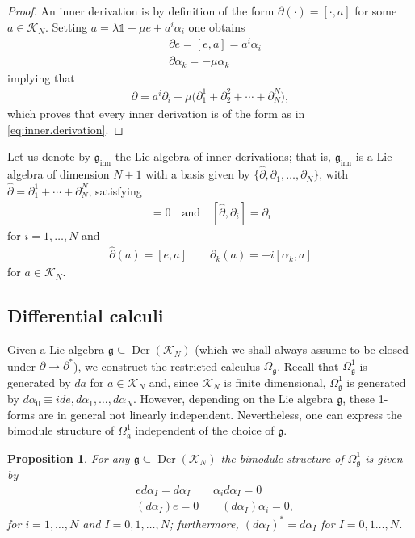 \documentclass{amsart}
\newcommand{\paraa}[1]{\big(#1\big)}
\newtheorem{proposition}[theorem]{Proposition}
\theoremstyle{definition}
\theoremstyle{remark}
\numberwithin{equation}{section}
\newcommand{\K}{\mathcal{K}}
\renewcommand{\mid}{\mathds{1}}
\newcommand{\KN}{\K_N}
\renewcommand{\d}{\partial}
\newcommand{\Der}{\operatorname{Der}}
\newcommand{\qand}{\quad\text{and}\quad}
\newcommand{\g}{\mathfrak{g}}
\newcommand{\ginn}{\g_{\textrm{inn}}}
\renewcommand{\dh}{\hat{\partial}}
\newcommand{\Omegag}[1]{\Omega^{#1}_{\g}}
\newcommand{\Omegaoneg}{\Omega^1_{\g}}
\begin{document}
\begin{proof}
  An inner derivation is by definition of the form
  $\d(\cdot)=[\cdot,a]$ for some $a\in\KN$. Setting
  $a=\lambda\mid+\mu e+a^i\alpha_i$ one obtains
  \begin{align*}
    &\d e = [e,a] = a^i\alpha_i\\
    &\d\alpha_k = -\mu\alpha_k
  \end{align*}
  implying that
  \begin{align*}
    \d = a^i\d_i - \mu\paraa{\d^1_1+\d^2_2+\cdots+\d_N^N},
  \end{align*}
  which proves that every inner derivation is of the form as in
  \eqref{eq:inner.derivation}.
\end{proof}

\noindent
Let us denote by $\ginn$ the Lie algebra of inner derivations; that
is, $\ginn$ is a Lie algebra of dimension $N+1$ with a basis given by
$\{\dh,\d_1,\ldots,\d_N\}$, with $\dh=\d_1^1+\cdots+\d_N^N$, satisfying
\begin{align*}
  [\d_i,\d_j] = 0\qand
  [\dh,\d_i] = \d_i
\end{align*}
for $i=1,\ldots,N$ and
\begin{align*}
  \dh(a) = [e,a]\qquad \d_k(a) = -i[\alpha_k,a]
\end{align*}
for $a\in\KN$.

\subsection{Differential calculi}

Given a Lie algebra $\g\subseteq\Der(\KN)$ (which we shall always
assume to be closed under $\d\to\d^\ast$), we construct the restricted
calculus $\Omegag{}$. Recall that $\Omegaoneg$ is generated by $da$
for $a\in\KN$ and, since $\KN$ is finite dimensional, $\Omegaoneg$ is
generated by $d\alpha_0\equiv ide, d\alpha_1,\ldots,
d\alpha_N$. However, depending on the Lie algebra $\g$, these 1-forms
are in general not linearly independent. Nevertheless, one can express
the bimodule structure of $\Omegaoneg$ independent of the choice of
$\g$.

\begin{proposition}\label{prop:Omega1.bimodule.structure}
  For any $\g\subseteq\Der(\KN)$ the bimodule structure of $\Omegag{1}$ is given by
  \begin{align*}
    &ed\alpha_I = d\alpha_I\qquad
    \alpha_id\alpha_I = 0\\
    &(d\alpha_I)e = 0\qquad (d\alpha_I)\alpha_i = 0,
  \end{align*}
  for $i=1,\ldots,N$ and $I=0,1,\ldots,N$; furthermore, $(d\alpha_I)^\ast=d\alpha_I$ for $I=0,1\ldots,N$.
\end{proposition}
\end{document}
